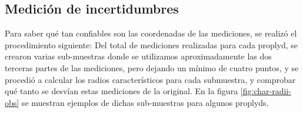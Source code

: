\subsection{Medición de incertidumbres}

Para saber qué tan confiables son las coordenadas de las mediciones, se realizó
el procedimiento siguiente: Del total de mediciones realizadas para cada proplyd,
se crearon varias sub-muestras donde se utilizamos aproximadamente las dos terceras partes de las mediciones, pero dejando un mínimo de cuatro puntos, y se procedió a calcular los radios característicos para cada submuestra, y comprobar qué tanto se desvían estas mediciones de la original. En la figura \ref{fig:char-radii-obs} se muestran ejemplos de dichas sub-muestras para algunos proplyds.


\begin{figure}
\begin{tabular}{@{}c@{}c@{}c@{}}
 

\end{tabular}
\end{figure}
